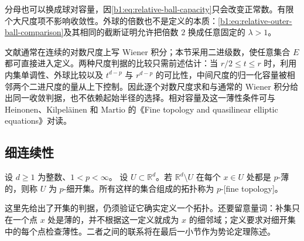 分母也可以换成球对容量，因\eqref{b1:eq:relative-ball-capacity}只会改变正常数。有限个大尺度项不影响收敛性。外球的倍数也不是定义的本质：\eqref{b1:eq:relative-outer-ball-comparison}及其相同的截断证明允许把倍数 \(2\) 换成任意固定的 \(\lambda>1\)。

\ProseParagraphBreak

文献通常在连续的对数尺度上写 Wiener 积分；本节采用二进级数，使任意集合 \(E\) 都可直接进入定义。两种尺度判据的比较只需前述估计：当 \(r/2\le t\le r\) 时，利用内集单调性、外球比较以及 \(t^{d-p}\) 与 \(r^{d-p}\) 的可比性，中间尺度的归一化容量被相邻两个二进尺度的量从上下控制。因此逐个对数尺度求和与通常的 Wiener 积分给出同一收敛判据，也不依赖起始半径的选择。相对容量及这一薄性条件可与 Heinonen、Kilpeläinen 和 Martio 的《Fine topology and quasilinear elliptic equations》\cite[Section 3]{Heinonen1989Fine}对读。

\subsection{细连续性}
\label{b1:subsec:260402}

\begin{definition}\label{b1:def:p-fine-topology}
设 \(d\geq1\) 为整数、\(1<p<\infty\)。
设 \(U\subset\mathbb R^d\)。若 \(\mathbb R^d\setminus U\) 在每个 \(x\in U\) 处都是 \(p\)-薄的，则称 \(U\) 为 \(p\)-细开集。所有这样的集合组成的拓扑称为 \(p\)-[fine topology]。
\end{definition}

这里先给出了开集的判据，仍须验证它确实定义一个拓扑。还要留意量词：补集只在一个点 \(x\) 处是薄的，并不根据这一定义就成为 \(x\) 的细邻域；定义要求对细开集中的每个点检查薄性。二者之间的联系将在最后一小节作为势论定理陈述。

